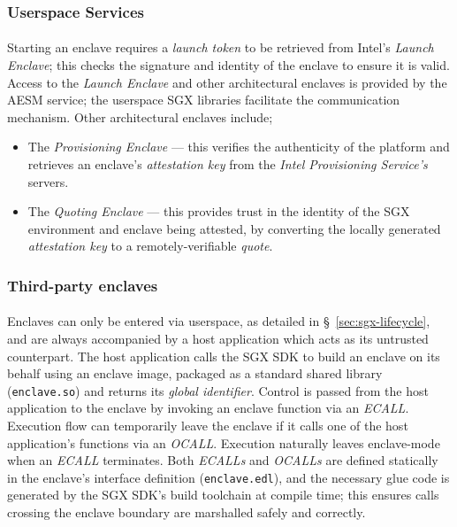 \subsubsection{Userspace Services}
\paragraph{} Starting an enclave requires a \textit{launch token} to be retrieved from Intel's \textit{Launch Enclave}; this checks the signature and identity of the enclave to ensure it is valid. Access to the \textit{Launch Enclave} and other architectural enclaves is provided by the AESM service; the userspace SGX libraries facilitate the communication mechanism. Other architectural enclaves include;

\begin{itemize}
    \item The \textit{Provisioning Enclave} --- this verifies the authenticity of the platform and retrieves an enclave's \textit{attestation key} from the \textit{Intel Provisioning Service's} servers.
    \item The \textit{Quoting Enclave} --- this provides trust in the identity of the SGX environment and enclave being attested, by converting the locally generated \textit{attestation key} to a remotely-verifiable \textit{quote}.
\end{itemize}

\subsubsection{Third-party enclaves}
\paragraph{} Enclaves can only be entered via userspace, as detailed in §~\ref{sec:sgx-lifecycle}, and are always accompanied by a host application which acts as its untrusted counterpart. The host application calls the SGX SDK to build an enclave on its behalf using an enclave image, packaged as a standard shared library (\texttt{enclave.so}) and returns its \textit{global identifier}. Control is passed from the host application to the enclave by invoking an enclave function via an \textit{ECALL}. Execution flow can temporarily leave the enclave if it calls one of the host application's functions via an \textit{OCALL}. Execution naturally leaves enclave-mode when an \textit{ECALL} terminates. Both \textit{ECALLs} and \textit{OCALLs} are defined statically in the enclave's interface definition (\texttt{enclave.edl}), and the necessary glue code is generated by the SGX SDK's build toolchain at compile time; this ensures calls crossing the enclave boundary are marshalled safely and correctly.


